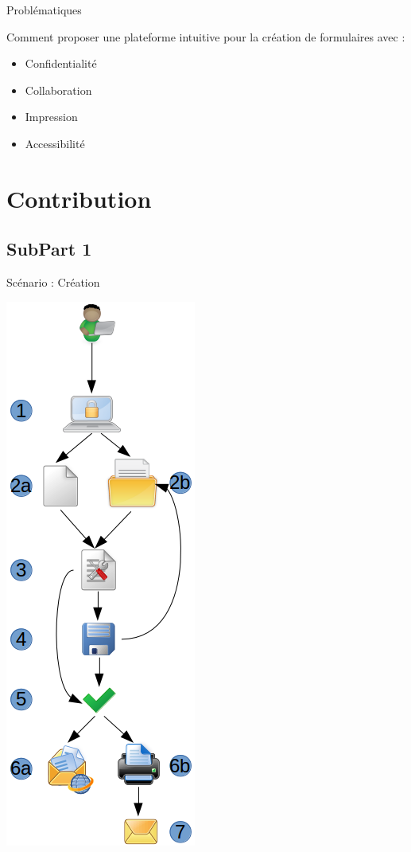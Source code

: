 \documentclass[11pt]{beamer}
\begin{document}
\begin{frame}{Problématiques}
\begin{block}{Comment proposer une plateforme intuitive pour la création de formulaires avec :}
	\begin{center}
		\begin{itemize}
			\item Confidentialité
			\item Collaboration
	  		\item Impression
	  		\item Accessibilité
	  	\end{itemize}
	\end{center}
\end{block}
\end{frame}






\section{Contribution}
\subsection*{SubPart 1}
\begin{frame}{Scénario : Création}
\begin{center}
\includegraphics[width=.19\paperwidth]{images/scenario_creation.png}
\end{center}
\end{frame}
\end{document}
